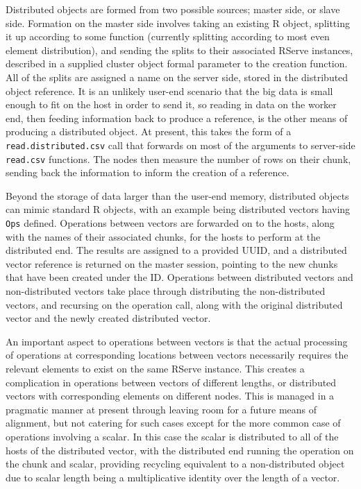 \documentclass[a4paper,10pt]{article}
\begin{document}
Distributed objects are formed from two possible sources; master side, or slave
side.  Formation on the master side involves taking an existing R object,
splitting it up according to some function (currently splitting according to
most even element distribution), and sending the splits to their associated
RServe instances, described in a supplied cluster object formal parameter to
the creation function.  All of the splits are assigned a name on the server
side, stored in the distributed object reference.  It is an unlikely user-end
scenario that the big data is small enough to fit on the host in order to send
it, so reading in data on the worker end, then feeding information back to
produce a reference, is the other means of producing a distributed object.  At
present, this takes the form of a \texttt{read.distributed.csv} call that
forwards on most of the arguments to server-side \texttt{read.csv} functions.
The nodes then measure the number of rows on their chunk, sending back the
information to inform the creation of a reference.

Beyond the storage of data larger than the user-end memory, distributed objects
can mimic standard R objects, with an example being distributed vectors having
\texttt{Ops} defined.  Operations between vectors are forwarded on to the hosts,
along with the names of their associated chunks, for the hosts to perform at
the distributed end.  The results are assigned to a provided UUID, and a
distributed vector reference is returned on the master session, pointing to the
new chunks that have been created under the ID.  Operations between distributed
vectors and non-distributed vectors take place through distributing the
non-distributed vectors, and recursing on the operation call, along with the
original distributed vector and the newly created distributed vector.

An important aspect to operations between vectors is that the actual processing
of operations at corresponding locations between vectors necessarily requires
the relevant elements to exist on the same RServe instance.  This creates a
complication in operations between vectors of different lengths, or distributed
vectors with corresponding elements on different nodes.  This is managed in a
pragmatic manner at present through leaving room for a future means of
alignment, but not catering for such cases except for the more common case of
operations involving a scalar.  In this case the scalar is distributed to all
of the hosts of the distributed vector, with the distributed end running the
operation on the chunk and scalar, providing recycling equivalent to a
non-distributed object due to scalar length being a multiplicative identity
over the length of a vector.
\end{document}
